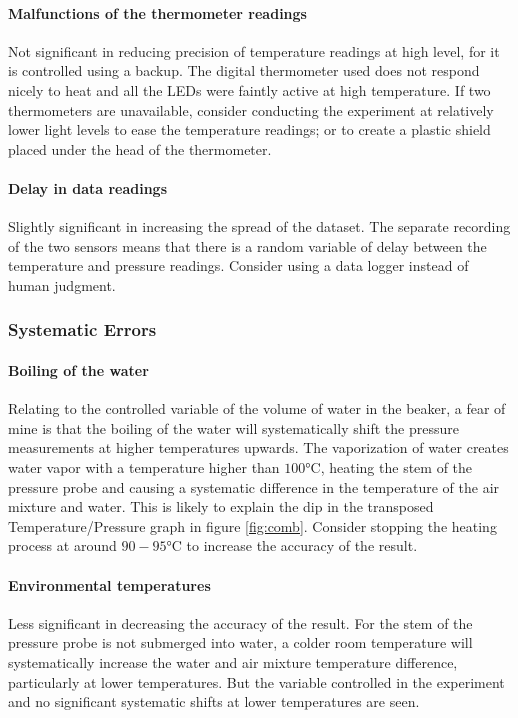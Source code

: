 \documentclass[a4paper,12pt]{article}
\begin{document}
\paragraph{Malfunctions of the thermometer readings}
Not significant in reducing precision of temperature readings at high level, for it is controlled using a backup. The digital thermometer used does not respond nicely to heat and all the LEDs were faintly active at high temperature. If two thermometers are unavailable, consider conducting the experiment at relatively lower light levels to ease the temperature readings; or to create a plastic shield placed under the head of the thermometer.

\paragraph{Delay in data readings}
Slightly significant in increasing the spread of the dataset. The separate recording of the two sensors means that there is a random variable of delay between the temperature and pressure readings. Consider using a data logger instead of human judgment.

\subsubsection{Systematic Errors}
\paragraph{Boiling of the water}
Relating to the controlled variable of the volume of water in the beaker, a fear of mine is that the boiling of the water will systematically shift the pressure measurements at higher temperatures upwards. The vaporization of water creates water vapor with a temperature higher than $100\si{\celsius}$, heating the stem of the pressure probe and causing a systematic difference in the temperature of the air mixture and water. This is likely to explain the dip in the transposed Temperature/Pressure graph in figure \ref{fig:comb}. Consider stopping the heating process at around $90-95\si{\celsius}$ to increase the accuracy of the result.

\paragraph{Environmental temperatures}
Less significant in decreasing the accuracy of the result. For the stem of the pressure probe is not submerged into water, a colder room temperature will systematically increase the water and air mixture temperature difference, particularly at lower temperatures. But the variable controlled in the experiment and no significant systematic shifts at lower temperatures are seen.
\end{document}
